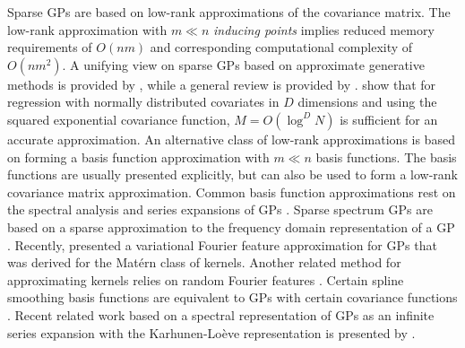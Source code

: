 \documentclass[onecolumn,a4paper,11pt]{article}
\begin{document}
Sparse GPs are based on low-rank approximations of the covariance matrix. The low-rank approximation with $m \ll n$ {\it inducing points} implies reduced memory requirements of $O(nm)$ and corresponding computational complexity of $O(nm^2)$. A unifying view on sparse GPs based on approximate generative methods is provided by \citet{quinonero2005unifying}, while a general review is provided by \citet{rasmussen2006gaussian}. \citet{Burt+Rasmussen+vanderWilk:2019} show that for regression with normally distributed covariates in $D$ dimensions and using the squared exponential covariance function, $M=O(\log^DN)$ is sufficient for an accurate approximation.
An alternative class of low-rank approximations is based on forming a basis function approximation with $m \ll n$ basis functions. The basis functions are usually presented explicitly, but can also be used to form a low-rank covariance matrix approximation. Common basis function approximations rest on the spectral analysis and series expansions of GPs \citep{loeve1977probability,trees1968detection,adler1981geometry,cramer2013stationary}. Sparse spectrum GPs are based on a sparse approximation to the frequency domain representation of a GP \citep{lazaro2010sparse,quia2010sparse,gal2015improving}. Recently, \citet{hensman2017variational} presented a variational Fourier feature approximation for GPs that was derived for the Mat{\'e}rn class of kernels. Another related method for approximating kernels relies on random Fourier features  \citep{rahimi2008random,rahimi2009weighted}. Certain spline smoothing basis functions are equivalent to GPs with certain covariance functions \citep{wahba1990spline,Furrer+Nychka:2007}. Recent related work based on a spectral representation of GPs as an infinite series expansion with the Karhunen-Loève representation \citep[see, e.g.,][]{grenander1981abstract} is presented by \citet{JSSv090i10}.

\end{document}
